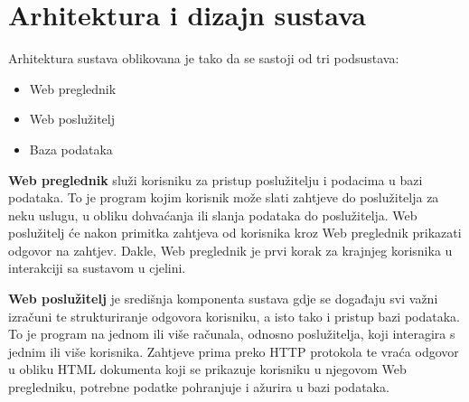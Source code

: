 \chapter{Arhitektura i dizajn sustava}
		


	
		Arhitektura sustava oblikovana je tako da se sastoji od tri podsustava:
		
		\begin{itemize}
			\item Web preglednik
			\item Web poslužitelj
			\item Baza podataka
		\end{itemize}
		
		\textbf{Web preglednik} služi korisniku za pristup poslužitelju i podacima u bazi podataka. To je program kojim korisnik može slati zahtjeve do poslužitelja za neku uslugu, u obliku dohvaćanja ili slanja podataka do poslužitelja. Web poslužitelj će nakon primitka zahtjeva od korisnika kroz Web preglednik prikazati odgovor na zahtjev. Dakle, Web preglednik je prvi korak za krajnjeg korisnika u interakciji sa sustavom u cjelini.
		
		
		\textbf{Web poslužitelj} je središnja komponenta sustava gdje se događaju svi važni izračuni te strukturiranje odgovora korisniku, a isto tako i pristup bazi podataka. To je program na jednom ili više računala, odnosno poslužitelja, koji interagira s jednim ili više korisnika. Zahtjeve prima preko HTTP protokola te vraća odgovor u obliku HTML dokumenta koji se prikazuje korisniku u njegovom Web pregledniku, potrebne podatke pohranjuje i ažurira u bazi podataka.
		
